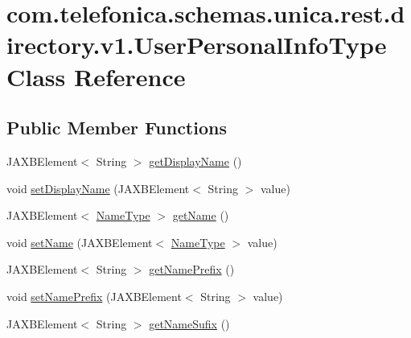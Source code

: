\hypertarget{classcom_1_1telefonica_1_1schemas_1_1unica_1_1rest_1_1directory_1_1v1_1_1UserPersonalInfoType}{
\section{com.telefonica.schemas.unica.rest.directory.v1.UserPersonalInfoType Class Reference}
\label{classcom_1_1telefonica_1_1schemas_1_1unica_1_1rest_1_1directory_1_1v1_1_1UserPersonalInfoType}
}
\subsection*{Public Member Functions}
\begin{DoxyCompactItemize}
\item 
JAXBElement$<$ String $>$ \hyperlink{classcom_1_1telefonica_1_1schemas_1_1unica_1_1rest_1_1directory_1_1v1_1_1UserPersonalInfoType_a72bfbc2788c19a6ba1fdf5ea28ec5e7c}{getDisplayName} ()
\item 
void \hyperlink{classcom_1_1telefonica_1_1schemas_1_1unica_1_1rest_1_1directory_1_1v1_1_1UserPersonalInfoType_ab44187ef5220144ed675a879ce46884a}{setDisplayName} (JAXBElement$<$ String $>$ value)
\item 
JAXBElement$<$ \hyperlink{classcom_1_1telefonica_1_1schemas_1_1unica_1_1rest_1_1directory_1_1v1_1_1NameType}{NameType} $>$ \hyperlink{classcom_1_1telefonica_1_1schemas_1_1unica_1_1rest_1_1directory_1_1v1_1_1UserPersonalInfoType_a7abaa2a27fcb33d85139963161669290}{getName} ()
\item 
void \hyperlink{classcom_1_1telefonica_1_1schemas_1_1unica_1_1rest_1_1directory_1_1v1_1_1UserPersonalInfoType_a3135007508585bc2d400411bd92320d2}{setName} (JAXBElement$<$ \hyperlink{classcom_1_1telefonica_1_1schemas_1_1unica_1_1rest_1_1directory_1_1v1_1_1NameType}{NameType} $>$ value)
\item 
JAXBElement$<$ String $>$ \hyperlink{classcom_1_1telefonica_1_1schemas_1_1unica_1_1rest_1_1directory_1_1v1_1_1UserPersonalInfoType_a7a585d3d49594c2f9b32cd802b9d94f9}{getNamePrefix} ()
\item 
void \hyperlink{classcom_1_1telefonica_1_1schemas_1_1unica_1_1rest_1_1directory_1_1v1_1_1UserPersonalInfoType_a13c2ab46a95a9c14f9e0314e6945463b}{setNamePrefix} (JAXBElement$<$ String $>$ value)
\item 
JAXBElement$<$ String $>$ \hyperlink{classcom_1_1telefonica_1_1schemas_1_1unica_1_1rest_1_1directory_1_1v1_1_1UserPersonalInfoType_a34dc014c60c819f6e79e7b533e61d527}{getNameSufix} ()

\end{DoxyCompactItemize}
